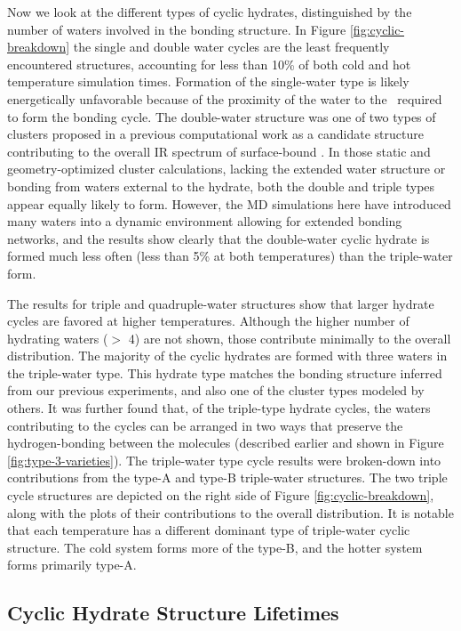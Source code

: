 \documentclass{article}
\begin{document}
Now we look at the different types of cyclic hydrates, distinguished by the number of waters involved in the bonding structure. In Figure \ref{fig:cyclic-breakdown} the single and double water cycles are the least frequently encountered structures, accounting for less than 10\% of both cold and hot temperature simulation times. Formation of the single-water type is likely energetically unfavorable because of the proximity of the water to the \suldiox~required to form the bonding cycle. The double-water structure was one of two types of clusters proposed in a previous computational work as a candidate structure contributing to the overall IR spectrum of surface-bound \suldiox.\cite{Baer2010} In those static and geometry-optimized cluster calculations, lacking the extended water structure or bonding from waters external to the hydrate, both the double and triple types appear equally likely to form. However, the MD simulations here have introduced many waters into a dynamic environment allowing for extended bonding networks, and the results show clearly that the double-water cyclic hydrate is formed much less often (less than 5\% at both temperatures) than the triple-water form.

The results for triple and quadruple-water structures show that larger hydrate cycles are favored at higher temperatures. Although the higher number of hydrating waters ($>$ 4) are not shown, those contribute minimally to the overall distribution. The majority of the cyclic hydrates are formed with three waters in the triple-water type. This hydrate type matches the bonding structure inferred from our previous experiments, and also one of the cluster types modeled by others.\cite{Tarbuck2005,Tarbuck2006,Baer2010} It was further found that, of the triple-type hydrate cycles, the waters contributing to the cycles can be arranged in two ways that preserve the hydrogen-bonding between the molecules (described earlier and shown in Figure \ref{fig:type-3-varieties}). The triple-water type cycle results were broken-down into contributions from the type-A and type-B triple-water structures. The two triple cycle structures are depicted on the right side of Figure \ref{fig:cyclic-breakdown}, along with the plots of their contributions to the overall distribution. It is notable that each temperature has a different dominant type of triple-water cyclic structure. The cold system forms more of the type-B, and the hotter system forms primarily type-A.

\subsection {Cyclic Hydrate Structure Lifetimes}
\end{document}
